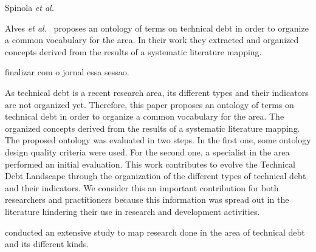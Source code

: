 Spinola \textit{et al.} \cite{Spinola2013MTD}


 Alves \textit{et al.}~\cite{Alves2014MTD} proposes an ontology of terms on technical debt in order to organize a common vocabulary for the area. In their work they extracted and organized concepts derived from the results of a systematic literature mapping. 

finalizar com o jornal essa sessao. 

As technical debt is a recent research area, its different types and their indicators are not organized yet. Therefore, this paper proposes an ontology of terms on technical debt in order to organize a common vocabulary for the area. The organized concepts derived from the results of a systematic literature mapping. The proposed ontology was evaluated in two steps. In the first one, some ontology design quality criteria were used. For the second one, a specialist in the area performed an initial evaluation. This work contributes to evolve the Technical Debt Landscape through the organization of the different types of technical debt and their indicators. We consider this an important contribution for both researchers and practitioners because this information was spread out in the literature hindering their use in research and development activities.

conducted an extensive study to map research done in the area of technical debt and its different kinds. 

 




